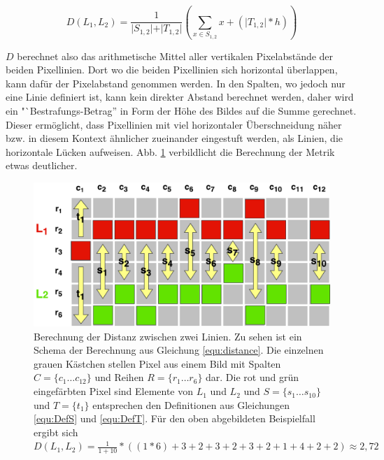 \begin{equation}
\label{equ:distance}
D(L_{1}, L_{2}) = \frac{1}{\vert S_{1,2} \vert + \vert T_{1,2} \vert} \left( \sum_{x \in S_{1, 2}}^{}x + ( \vert T_{1,2} \vert * h ) \right)
\end{equation}

\(D\) berechnet also das arithmetische Mittel aller vertikalen Pixelabstände der beiden Pixellinien. Dort wo die beiden Pixellinien sich horizontal überlappen, kann dafür der Pixelabstand genommen werden. In den Spalten, wo jedoch nur eine Linie definiert ist, kann kein direkter Abstand berechnet werden, daher wird ein "`Bestrafungs-Betrag'' in Form der Höhe des Bildes auf die Summe gerechnet. Dieser ermöglicht, dass Pixellinien mit viel horizontaler Überschneidung näher bzw. in diesem Kontext ähnlicher zueinander eingestuft werden, als Linien, die horizontale Lücken aufweisen. Abb. \ref{fig:LineDistanceSchematic} verbildlicht die Berechnung der Metrik etwas deutlicher. 

\begin{figure}
\centering \includegraphics[width=\textwidth]{images/LineDistance.pdf}
\caption[Berechnung der Distanz zwischen zwei Linien]{Berechnung der Distanz zwischen zwei Linien. Zu sehen ist ein Schema der Berechnung aus Gleichung \ref{equ:distance}. Die einzelnen grauen Kästchen stellen Pixel aus einem Bild mit Spalten \(C = \lbrace c_{1} \ldots c_{12} \rbrace\) und Reihen \(R = \lbrace r_{1} \ldots r_{6} \rbrace\) dar. Die rot und grün eingefärbten Pixel sind Elemente von \(L_{1}\) und \(L_{2}\) und \(S = \lbrace s_{1} \ldots s_{10} \rbrace\) und \(T = \lbrace t_{1} \rbrace\) entsprechen den Definitionen aus Gleichungen \ref{equ:DefS} und \ref{equ:DefT}. Für den oben abgebildeten Beispielfall ergibt sich \(D(L_1, L_2) = \frac{1}{1 + 10} * \left(\left(1 * 6\right) + 3 + 2 + 3 + 2 + 3 + 2 + 1 + 4 + 2 + 2\right) \approx 2,72 \)}\label{fig:LineDistanceSchematic}
\end{figure}

